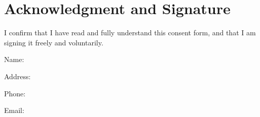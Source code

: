 
\section{Acknowledgment and Signature}
\label{sec:signatures}
I confirm that I have read and fully understand this consent form, and that I am signing it freely and voluntarily.

\vspace{0.5in}

\vspace{0.2in}
\hspace{3in}
Name: \ParticipantName{}

\vspace{0.2in}

\hspace{3in}
\parbox{3.5in}{
Address: \ParticipantAddress{}
}
\vspace{0.2in}

\hspace{3in}
Phone: \ParticipantPhone{}

\vspace{0.2in}

\hspace{3in}
Email: \ParticipantEmail{}

